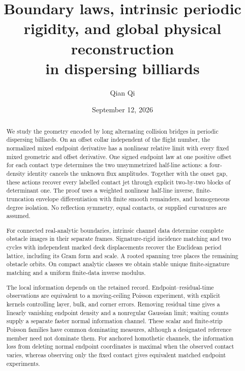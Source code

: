 
\title[Boundary laws and intrinsic periodic rigidity]{Boundary laws, intrinsic periodic rigidity, and global physical reconstruction\\
in dispersing billiards}
\author{Qian Qi}
\date{September 12, 2026}

\begin{abstract}
We study the geometry encoded by long alternating collision bridges in
periodic dispersing billiards.  On an offset collar independent of the flight
number, the normalized mixed endpoint derivative has a nonlinear relative
limit with every fixed mixed geometric and offset derivative.  One signed
endpoint law at one positive offset for each contact type determines the two
unsymmetrized half-line actions: a four-density identity cancels the unknown
flux amplitudes.  Together with the onset gap, these actions recover every
labelled contact jet through explicit two-by-two blocks of determinant one.
The proof uses a weighted nonlinear half-line inverse, finite-truncation
envelope differentiation with finite smooth remainders, and homogeneous
degree isolation.  No reflection
symmetry, equal contacts, or supplied curvatures are assumed.

For connected real-analytic boundaries, intrinsic channel data determine
complete obstacle images in their separate frames.  Signature-rigid incidence
matching and two cycles with independent marked deck displacements recover
the Euclidean period lattice, including its Gram form and scale.  A rooted
spanning tree places the remaining obstacle orbits.  On compact analytic
classes we obtain stable unique finite-signature matching and a uniform
finite-data inverse modulus.

The local information depends on the retained record.  Endpoint--residual-time
observations are equivalent to a moving-ceiling Poisson experiment, with
explicit kernels controlling layer, bulk, and corner errors.  Removing
residual time gives a linearly vanishing endpoint density and a nonregular
Gaussian limit; waiting counts supply a separate faster normal information
channel.  These scalar and finite-strip Poisson families have common
dominating measures, although a designated reference member need not
dominate them.  For anchored homothetic channels, the information loss from
deleting normal endpoint coordinates is maximal when the observed contact
varies, whereas observing only the fixed contact gives equivalent matched
endpoint experiments.


\end{abstract}
